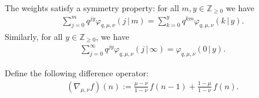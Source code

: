 \begin{Lemma}
	\label{lemma:phi_symmetry}
	The weights satisfy a symmetry property: for all
	$m,y\in \mathbb{Z}_{\ge0}$ we have
	\begin{gather*}
		\sum_{j=0}^{m}q^{jy}\varphi_{q,\mu,\nu}(j\,|\, m)
		=\sum_{k=0}^{y} q^{km}\varphi_{q,\mu,\nu}(k\,|\, y).
	\end{gather*}
	Similarly, for all $y\in \mathbb{Z}_{\ge0}$, we have
	\begin{gather*}
		\sum_{j=0}^{\infty}q^{jy}\varphi_{q,\mu,\nu}(j\,|\, \infty)=
		\varphi_{q,\mu,\nu}(0\,|\, y).
	\end{gather*}
\end{Lemma}

Define the following difference operator:
\begin{gather}
	\label{eq:nabla_mu_nu}
	(\nabla_{\mu,\nu}f)(n):=\frac{\mu-\nu}{1-\nu}\,f(n-1)+\frac{1-\mu}{1-\nu}\,f(n).
\end{gather}

